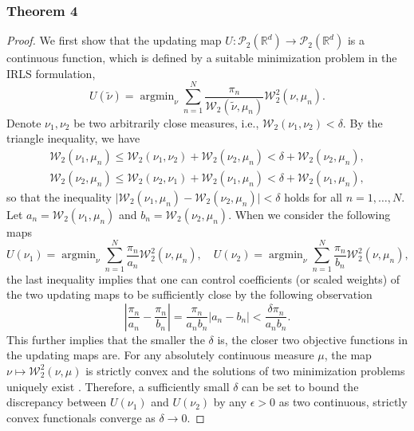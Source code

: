 \documentclass[11pt]{article}
\DeclareMathOperator*{\argmin}{argmin}
\newcommand{\calP}{\mathcal{P}}
\newcommand{\calW}{\mathcal{W}}
\newcommand{\bbR}{\mathbb{R}}
\begin{document}
\subsubsection*{Theorem 4}
\begin{proof}
	We first show that the updating map $U:\calP_2 (\bbR^d) \rightarrow \calP_2 (\bbR^d)$ is a continuous function, which is defined by a suitable minimization problem in the IRLS formulation,
	\begin{equation*}
	U(\tilde{\nu}) = \argmin_{\nu} \sum_{n=1}^N \frac{\pi_n}{\calW_2 (\tilde{\nu}, \mu_n)} \calW_2^2 (\nu, \mu_n).
	\end{equation*}
	Denote $\nu_1, \nu_2$ be two arbitrarily close measures, i.e., $\calW_2(\nu_1, \nu_2) <\delta$. By the triangle inequality, we have 
	\begin{equation*}
	\begin{gathered}
	\calW_2 (\nu_1, \mu_n) \leq \calW_2 (\nu_1, \nu_2) + \calW_2 (\nu_2, \mu_n) < \delta + \calW_2(\nu_2, \mu_n), \\ 
	\calW_2 (\nu_2, \mu_n) \leq \calW_2 (\nu_2, \nu_1) + \calW_2 (\nu_1, \mu_n) < \delta + \calW_2(\nu_1, \mu_n),
	\end{gathered}
	\end{equation*}
	so that the inequality $\vert \calW_2(\nu_1, \mu_n) - \calW_2(\nu_2, \mu_n)\vert<\delta$ holds for all $n=1,\ldots,N$. Let $a_n = \calW_2(\nu_1, \mu_n)$ and $b_n = \calW_2 (\nu_2, \mu_n)$. When we consider the following maps
	\begin{equation*}
	U(\nu_1) = \argmin_{\nu} \sum_{n=1}^N \frac{\pi_n}{a_n} \calW_2^2 (\nu, \mu_n),\quad					U(\nu_2) = \argmin_{\nu} \sum_{n=1}^N \frac{\pi_n}{b_n} \calW_2^2 (\nu, \mu_n),
	\end{equation*}
	the last inequality implies that one can control coefficients (or scaled weights) of the two updating maps to be sufficiently close by the following observation
	\begin{equation*}
	\left\vert \frac{\pi_n}{a_n} - \frac{\pi_n}{b_n} \right\vert = \frac{\pi_n}{a_n b_n} \left\vert a_n - b_n \right\vert < \frac{\delta \pi_n}{a_n b_n} .
	\end{equation*}
	This further implies that the smaller the $\delta$ is, the closer two objective functions in the updating maps are. For any absolutely continuous measure $\mu$, the map $\nu \mapsto \calW_2^2 (\nu, \mu)$ is strictly convex and the solutions of two minimization problems uniquely exist  \citep{bigot_2018_CharacterizationBarycentersWasserstein}. Therefore, a sufficiently small $\delta$ can be set to bound the discrepancy between $U(\nu_1)$ and $U(\nu_2)$ by any $\epsilon > 0$ as two continuous, strictly convex functionals converge as $\delta \rightarrow 0$. 
	

\end{proof}
\end{document}
